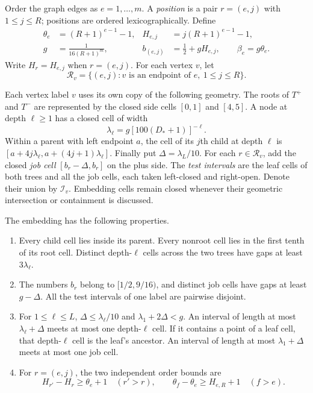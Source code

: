 Order the graph edges as $e=1,\ldots,m$. A \emph{position} is a pair
$r=(e,j)$ with $1\le j\le R$; positions are ordered lexicographically.
Define
\begin{equation}\label{eq:position-coordinates}
 \begin{aligned}
  \theta_e&=(R+1)^{e-1}-1,
  &H_{e,j}&=j(R+1)^{e-1}-1,\\
  g&=\frac{1}{16(R+1)^m},
  &b_{(e,j)}&=\frac12+gH_{e,j},\qquad \beta_e=g\theta_e.
 \end{aligned}
\end{equation}
Write $H_r=H_{e,j}$ when $r=(e,j)$. For each vertex $v$, let
\[
 \mathcal R_v=\{(e,j):v\text{ is an endpoint of }e,\ 1\le j\le R\}.
\]

Each vertex label $v$ uses its own copy of the following geometry.
The roots of $T^+$ and $T^-$ are represented by the closed side cells
$[0,1]$ and $[4,5]$. A node at depth $\ell\ge1$ has a closed cell of
width
\[
 \lambda_\ell=g[100(D_*+1)]^{-\ell}.
\]
Within a parent with left endpoint $a$, the cell of its $j$th child at
depth $\ell$ is
$[a+4j\lambda_\ell,a+(4j+1)\lambda_\ell]$.
Finally put $\Delta=\lambda_L/10$. For each $r\in\mathcal R_v$, add the
closed \emph{job cell} $[b_r-\Delta,b_r]$ on the plus side.
The \emph{test intervals} are the leaf cells of both trees and all the
job cells, each taken left-closed and right-open. Denote their union by
$\mathcal I_v$. Embedding cells remain closed whenever their geometric
intersection or containment is discussed.

\begin{lemma}\label{lem:geometry}
The embedding has the following properties.
\begin{enumerate}
 \item Every child cell lies inside its parent. Every nonroot cell lies
       in the first tenth of its root cell. Distinct depth-$\ell$ cells
       across the two trees have gaps at least $3\lambda_\ell$.
 \item The numbers $b_r$ belong to $[1/2,9/16)$, and distinct job cells
       have gaps at least $g-\Delta$. All the test intervals of one
       label are pairwise disjoint.
 \item For $1\le\ell\le L$,
       $\Delta\le\lambda_\ell/10$ and
       $\lambda_1+2\Delta<g$. An interval of length at most
       $\lambda_\ell+\Delta$ meets at most one depth-$\ell$ cell. If it
       contains a point of a leaf cell, that depth-$\ell$ cell is the
       leaf's ancestor. An interval of length at most
       $\lambda_1+\Delta$ meets at most one job cell.
 \item For $r=(e,j)$, the two independent order bounds are
       \begin{equation}\label{eq:coordinate-order}
        H_{r'}-H_r\ge\theta_e+1\quad(r'>r),\qquad
        \theta_f-\theta_e\ge H_{e,R}+1\quad(f>e).
       \end{equation}
\end{enumerate}
\end{lemma}

